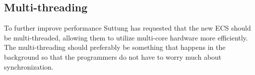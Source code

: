 
\subsection{Multi-threading}
\label{subsec:requirements_performance_multi_threading}
To further improve performance Suttung has requested that the new ECS should be multi-threaded, allowing them to utilize multi-core hardware more efficiently.
The multi-threading should preferably be something that happens in the background so that the programmers do not have to worry much about synchronization.

